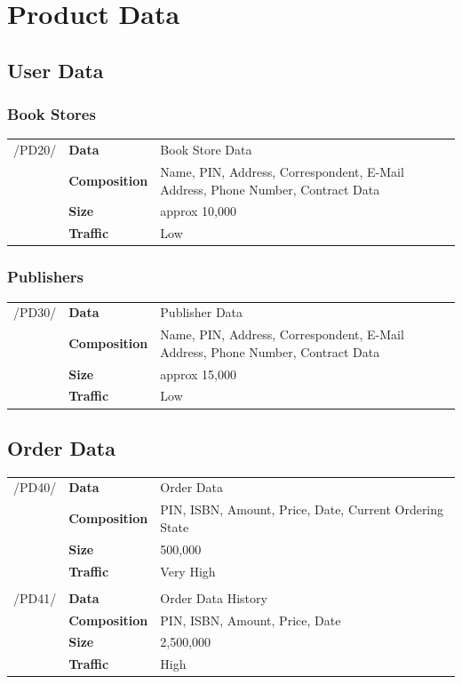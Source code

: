 \documentclass[11pt,a4paper,oneside,svgnames]{report}
\begin{document}
\chapter{Product Data}
\section{User Data}
\subsection{Book Stores}

\begin{tabular}{llp{8cm}}
\cellcolor{white}/PD20/	& \textbf{Data}			& Book Store Data\\
\cellcolor{white}		& \textbf{Composition}	& Name, PIN, Address, Correspondent, E-Mail Address, Phone Number, Contract Data\\
\cellcolor{white}		& \textbf{Size}		& approx 10,000\\
\cellcolor{white}		& \textbf{Traffic}		& Low\\
\end{tabular} 
\subsection{Publishers}
\begin{tabular}{llp{8cm}}
\cellcolor{white}/PD30/	& \textbf{Data}			& Publisher Data\\
\cellcolor{white}		& \textbf{Composition}	& Name, PIN, Address, Correspondent, E-Mail Address, Phone Number, Contract Data\\
\cellcolor{white}		& \textbf{Size}		& approx 15,000\\
\cellcolor{white}		& \textbf{Traffic}		& Low\\
\end{tabular} 
\section{Order Data}
\begin{tabular}{llp{8cm}}
\cellcolor{white}/PD40/	& \textbf{Data}			& Order Data\\
\cellcolor{white}		& \textbf{Composition}	& PIN, ISBN, Amount, Price, Date, Current Ordering State\\
\cellcolor{white}		& \textbf{Size}		& 500,000\\
\cellcolor{white}		& \textbf{Traffic}		& Very High\\
\cellcolor{white}\hfill \\
\cellcolor{white}/PD41/	& \textbf{Data}			& Order Data History\\
\cellcolor{white}		& \textbf{Composition}	& PIN, ISBN, Amount, Price, Date\\
\cellcolor{white}		& \textbf{Size}		& 2,500,000\\
\cellcolor{white}		& \textbf{Traffic}		& High\\
\end{tabular} 
\end{document}

